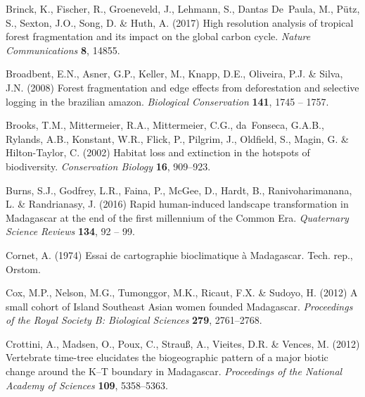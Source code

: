 \documentclass[a4paper, 12pt, leqno]{article} %
\begin{document}
\begin{thebibliography}{60}
Brinck, K., Fischer, R., Groeneveld, J., Lehmann, S., Dantas De~Paula, M.,
  Pütz, S., Sexton, J.O., Song, D. \& Huth, A. (2017) High resolution analysis
  of tropical forest fragmentation and its impact on the global carbon cycle.
  \emph{Nature Communications} \textbf{8}, 14855.

Broadbent, E.N., Asner, G.P., Keller, M., Knapp, D.E., Oliveira, P.J. \& Silva,
  J.N. (2008) Forest fragmentation and edge effects from deforestation and
  selective logging in the brazilian amazon. \emph{Biological Conservation}
  \textbf{141}, 1745 -- 1757.

Brooks, T.M., Mittermeier, R.A., Mittermeier, C.G., da~Fonseca, G.A.B.,
  Rylands, A.B., Konstant, W.R., Flick, P., Pilgrim, J., Oldfield, S., Magin,
  G. \& Hilton-Taylor, C. (2002) Habitat loss and extinction in the hotspots of
  biodiversity. \emph{Conservation Biology} \textbf{16}, 909--923.

Burns, S.J., Godfrey, L.R., Faina, P., McGee, D., Hardt, B., Ranivoharimanana,
  L. \& Randrianasy, J. (2016) {Rapid human-induced landscape transformation in
  Madagascar at the end of the first millennium of the Common Era}.
  \emph{Quaternary Science Reviews} \textbf{134}, 92 -- 99.

Cornet, A. (1974) {Essai de cartographie bioclimatique à Madagascar}. Tech.
  rep., Orstom.

Cox, M.P., Nelson, M.G., Tumonggor, M.K., Ricaut, F.X. \& Sudoyo, H. (2012) {A
  small cohort of Island Southeast Asian women founded Madagascar}.
  \emph{Proceedings of the Royal Society B: Biological Sciences} \textbf{279},
  2761--2768.

Crottini, A., Madsen, O., Poux, C., Strau{\ss}, A., Vieites, D.R. \& Vences, M.
  (2012) {Vertebrate time-tree elucidates the biogeographic pattern of a major
  biotic change around the K--T boundary in Madagascar}. \emph{Proceedings of
  the National Academy of Sciences} \textbf{109}, 5358--5363.


\end{thebibliography}
\end{document}
